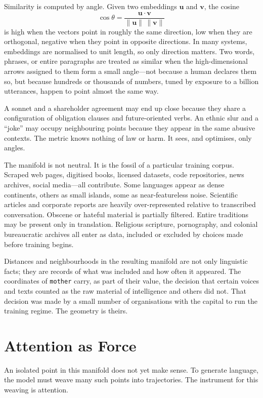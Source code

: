 \documentclass[12pt,a4paper]{article}
\begin{document}
Similarity is computed by angle. Given two embeddings $\mathbf{u}$ and $\mathbf{v}$, the cosine
\[
\cos\theta = \frac{\mathbf{u}\cdot\mathbf{v}}{\|\mathbf{u}\|\,\|\mathbf{v}\|}
\]
is high when the vectors point in roughly the same direction, low when they are orthogonal, negative when they point in opposite directions. In many systems, embeddings are normalised to unit length, so only direction matters. Two words, phrases, or entire paragraphs are treated as similar when the high-dimensional arrows assigned to them form a small angle---not because a human declares them so, but because hundreds or thousands of numbers, tuned by exposure to a billion utterances, happen to point almost the same way.

A sonnet and a shareholder agreement may end up close because they share a configuration of obligation clauses and future-oriented verbs. An ethnic slur and a ``joke'' may occupy neighbouring points because they appear in the same abusive contexts. The metric knows nothing of law or harm. It sees, and optimises, only angles.

The manifold is not neutral. It is the fossil of a particular training corpus. Scraped web pages, digitised books, licensed datasets, code repositories, news archives, social media---all contribute. Some languages appear as dense continents, others as small islands, some as near-featureless noise. Scientific articles and corporate reports are heavily over-represented relative to transcribed conversation. Obscene or hateful material is partially filtered. Entire traditions may be present only in translation. Religious scripture, pornography, and colonial bureaucratic archives all enter as data, included or excluded by choices made before training begins.

Distances and neighbourhoods in the resulting manifold are not only linguistic facts; they are records of what was included and how often it appeared. The coordinates of \texttt{mother} carry, as part of their value, the decision that certain voices and texts counted as the raw material of intelligence and others did not. That decision was made by a small number of organisations with the capital to run the training regime. The geometry is theirs.

\section{Attention as Force}

An isolated point in this manifold does not yet make sense. To generate language, the model must weave many such points into trajectories. The instrument for this weaving is attention.
\end{document}
